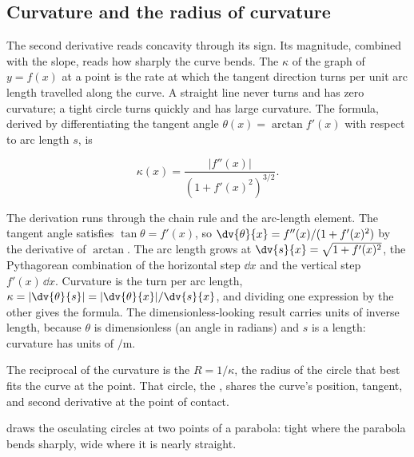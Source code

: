 \subsection{Curvature and the radius of curvature}

The second derivative reads concavity through its sign. Its
magnitude, combined with the slope, reads how sharply the curve
bends. The  $\kappa$ of the graph of $y = f(x)$
at a point is the rate at which the tangent direction turns per unit
arc length travelled along the curve. A straight line never turns
and has zero curvature; a tight circle turns quickly and has large
curvature. The formula, derived by differentiating the tangent
angle $\theta(x) = \arctan f'(x)$ with respect to arc length
$s$, is

\[
\kappa(x) = \frac{|f''(x)|}{\left(1 + f'(x)^{2}\right)^{3/2}}.
\]

The derivation runs through the chain rule and the arc-length
element. The tangent angle satisfies $\tan\theta = f'(x)$, so
$\dv{\theta}{x} = f''(x)/(1 + f'(x)^{2})$ by the derivative of
$\arctan$. The arc length grows at $\dv{s}{x} = \sqrt{1 +
f'(x)^{2}}$, the Pythagorean combination of the horizontal step
$\dd x$ and the vertical step $f'(x)\,\dd x$. Curvature is the turn
per arc length, $\kappa = |\dv{\theta}{s}| = |\dv{\theta}{x}| /
\dv{s}{x}$, and dividing one expression by the other gives the
formula. The dimensionless-looking result carries units of inverse
length, because $\theta$ is dimensionless (an angle in radians) and
$s$ is a length: curvature has units of $\si{\per\meter}$.

The reciprocal of the curvature is the  $R = 1/\kappa$, the radius of the circle that best fits
the curve at the point. That circle, the , shares the curve's position, tangent, and second
derivative at the point of contact.



draws the osculating circles at two points of a parabola: tight
where the parabola bends sharply, wide where it is nearly straight.

